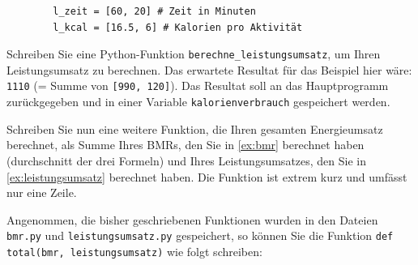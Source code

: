 \begin{mysubmission}
	\begin{lstlisting}
		l_zeit = [60, 20] # Zeit in Minuten
		l_kcal = [16.5, 6] # Kalorien pro Aktivität
	\end{lstlisting}
	Schreiben Sie eine Python-Funktion \lstinline|berechne_leistungsumsatz|, um Ihren Leistungsumsatz zu berechnen. Das erwartete Resultat für das Beispiel hier wäre: \lstinline|1110| (= Summe von \lstinline|[990, 120]|). Das Resultat soll an das Hauptprogramm zurückgegeben und in einer Variable \texttt{kalorienverbrauch} gespeichert werden.
	\begin{myanswer}
		
	\end{myanswer}

\end{mysubmission}

\begin{mysubmission}
	Schreiben Sie nun eine weitere Funktion, die Ihren gesamten Energieumsatz berechnet, als Summe Ihres BMRs, den Sie in \cref{ex:bmr} berechnet haben (durchschnitt der drei Formeln) und Ihres Leistungsumsatzes, den Sie in \cref{ex:leistungsumsatz} berechnet haben. Die Funktion ist extrem kurz und umfässt nur eine Zeile.
	\begin{myanswer}
		Angenommen, die bisher geschriebenen Funktionen wurden in den Dateien \texttt{bmr.py} und \texttt{leistungsumsatz.py} gespeichert, so können Sie die Funktion \lstinline|def total(bmr, leistungsumsatz)| wie folgt schreiben:
		
	\end{myanswer}
\end{mysubmission}




